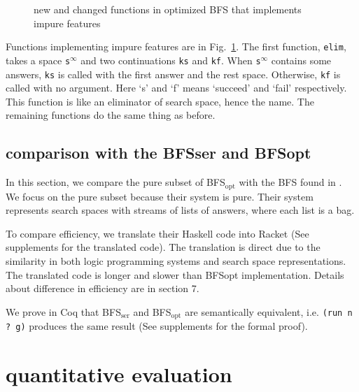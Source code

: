 \documentclass[format=acmlarge, review=true, authordraft=true]{acmart}
\newcommand{\BFSopt}[0]{BFS$_\textrm{opt}$}
\newcommand{\BFSser}[0]{BFS$_\textrm{ser}$}
\begin{document}
\begin{figure}
		
	\caption{new and changed functions in optimized BFS that implements impure 
		features}
	\label{BFS-opt-cont}
\end{figure}

Functions implementing impure features are in Fig.~\ref{BFS-opt-cont}. The 
first function, \texttt{elim}, takes a space \texttt{s$^\infty$} and two 
continuations \texttt{ks} and \texttt{kf}. When \texttt{s$^\infty$} contains 
some 
answers, \texttt{ks} is called with the first answer and the rest space. 
Otherwise, \texttt{kf} is called with no argument. Here `s' and `f' means 
`succeed' and `fail' respectively. This function is like an eliminator of 
search space, hence the name. The remaining functions do the same thing as 
before.

\subsection{comparison with the BFSser and BFSopt}

In this section, we compare the pure subset of \BFSopt{} with the BFS 
found in \citet{seres1999algebra}. We focus on the pure subset because 
their system is pure. Their system represents search spaces with streams of 
lists of answers, where each list is a bag.

To compare efficiency, we translate their Haskell code into Racket (See 
supplements for the translated code). The translation is direct 
due to the similarity in both logic programming systems and search space 
representations. The translated code is longer and slower than BFSopt
implementation. Details about 
difference in efficiency are in section 7.

We prove in Coq that \BFSser{} and \BFSopt{} are semantically equivalent, i.e. \texttt{(run n ? g)} 
produces the same result (See supplements for the formal proof).

\section{quantitative evaluation}
\end{document}

